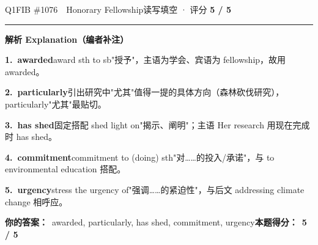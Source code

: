 \documentclass[11pt]{article}
\newcommand{\ptesub}[1]{%
  \par\needspace{2\baselineskip}\smallskip
  {\color{cAccent}\rule[-0.2ex]{3pt}{1.05em}}\hspace{6pt}%
  {\bfseries\color{cHead}#1}\par\nopagebreak\smallskip}
\begin{document}
\begin{qblock}{Q1\quad FIB \#1076\ \ Honorary Fellowship}{读写填空 · 评分 \textcolor{cAccent}{\bfseries 5 / 5}}
\ptesub{解析 Explanation（编者补注）}
\begin{notebox}\footnotesize
\textbf{1.\ awarded}\quad award sth to sb"授予"，主语为学会、宾语为 fellowship，故用 awarded。\par\smallskip
\textbf{2.\ particularly}\quad 引出研究中"尤其"值得一提的具体方向（森林砍伐研究），particularly"尤其"最贴切。\par\smallskip
\textbf{3.\ has shed}\quad 固定搭配 shed light on"揭示、阐明"；主语 Her research 用现在完成时 has shed。\par\smallskip
\textbf{4.\ commitment}\quad commitment to (doing) sth"对……的投入/承诺"，与 to environmental education 搭配。\par\smallskip
\textbf{5.\ urgency}\quad stress the urgency of"强调……的紧迫性"，与后文 addressing climate change 相呼应。
\end{notebox}
\smallskip
\textbf{你的答案：}\ awarded, particularly, has shed, commitment, urgency\qquad\textbf{本题得分：}\ {\color{cAccent}\bfseries 5 / 5}
\end{qblock}
\end{document}
